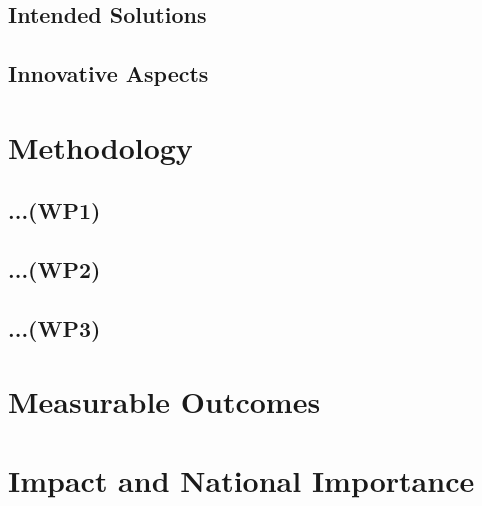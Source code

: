 \documentclass[11pt,english,twocolumn]{article}
\begin{document}
\subsection*{Intended Solutions}

\subsection*{Innovative Aspects}

\section{Methodology}

\subsection*{...(WP1)}

\subsection*{...(WP2)}

\subsection*{...(WP3)}

\section{Measurable Outcomes}

\section{Impact and National Importance}

\let\oldbibliography\thebibliography
\renewcommand{\thebibliography}[1]{\oldbibliography{#1}
\setlength{\itemsep}{-3pt}}


{
\scriptsize

}
\end{document}

